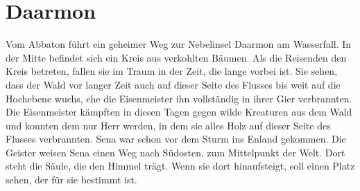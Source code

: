 \documentclass[12pt,a4paper,onecolumn,twoside,ngerman]{book}
\newcommand{\Sena}{Sena}
\newcommand{\Enland}{Enland}
\newcommand{\Darmon}{Daarmon}
\newcommand{\Eisenmeister}{Eisenmeister}
\newcommand{\Abaton}{Abbaton}
\begin{document}
\section{\Darmon}
Vom {\Abaton} führt ein geheimer Weg zur Nebelinsel {\Darmon} am Wasserfall. In der Mitte befindet sich ein Kreis aus verkohlten Bäumen.\linebreak
Als die Reisenden den Kreis betreten, fallen sie im Traum in der Zeit, die lange vorbei ist. Sie sehen, dass der Wald vor langer Zeit auch auf dieser Seite des Flusses bis weit auf die Hochebene wuchs, ehe die {\Eisenmeister} ihn vollständig in ihrer Gier verbrannten. Die {\Eisenmeister} kämpften in diesen Tagen gegen wilde Kreaturen aus dem Wald und konnten dem nur Herr werden, in dem sie alles Holz auf dieser Seite des Flusses verbrannten.\linebreak
{\Sena} war schon vor dem Sturm ins {\Enland} gekommen. Die Geister weisen {\Sena} einen Weg nach Südosten, zum Mittelpunkt der Welt. Dort steht die Säule, die den Himmel trägt. Wenn sie dort hinaufsteigt, soll einen Platz sehen, der für sie bestimmt ist.

\end{document}
